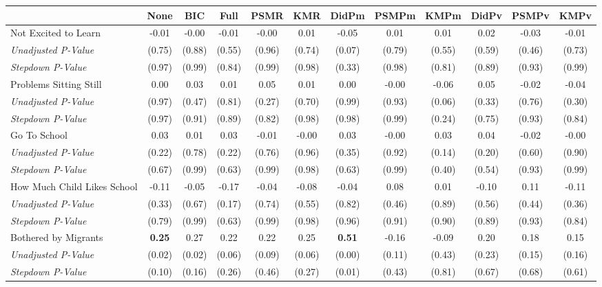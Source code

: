 \begin{tabular}{l c c c c c c c c c c c}
\toprule
 & None & BIC & Full & PSMR & KMR & DidPm & PSMPm & KMPm & DidPv & PSMPv & KMPv \\
\midrule
Not Excited to Learn & -0.01 & -0.00 & -0.01 & -0.00 & 0.01 & -0.05 & 0.01 & 0.01 & 0.02 & -0.03 & -0.01 \\
\quad \textit{Unadjusted P-Value} & (0.75) & (0.88) & (0.55) & (0.96) & (0.74) & (0.07) & (0.79) & (0.55) & (0.59) & (0.46) & (0.73) \\
\quad \textit{Stepdown P-Value} & (0.97) & (0.99) & (0.84) & (0.99) & (0.98) & (0.33) & (0.98) & (0.81) & (0.89) & (0.93) & (0.99) \\
Problems Sitting Still & 0.00 & 0.03 & 0.01 & 0.05 & 0.01 & 0.00 & -0.00 & -0.06 & 0.05 & -0.02 & -0.04 \\
\quad \textit{Unadjusted P-Value} & (0.97) & (0.47) & (0.81) & (0.27) & (0.70) & (0.99) & (0.93) & (0.06) & (0.33) & (0.76) & (0.30) \\
\quad \textit{Stepdown P-Value} & (0.97) & (0.91) & (0.89) & (0.82) & (0.98) & (0.98) & (0.99) & (0.24) & (0.75) & (0.93) & (0.84) \\
Go To School & 0.03 & 0.01 & 0.03 & -0.01 & -0.00 & 0.03 & -0.00 & 0.03 & 0.04 & -0.02 & -0.00 \\
\quad \textit{Unadjusted P-Value} & (0.22) & (0.78) & (0.22) & (0.76) & (0.96) & (0.35) & (0.92) & (0.14) & (0.20) & (0.60) & (0.90) \\
\quad \textit{Stepdown P-Value} & (0.67) & (0.99) & (0.63) & (0.99) & (0.98) & (0.63) & (0.99) & (0.40) & (0.54) & (0.93) & (0.99) \\
How Much Child Likes School & -0.11 & -0.05 & -0.17 & -0.04 & -0.08 & -0.04 & 0.08 & 0.01 & -0.10 & 0.11 & -0.11 \\
\quad \textit{Unadjusted P-Value} & (0.33) & (0.67) & (0.17) & (0.74) & (0.55) & (0.82) & (0.46) & (0.89) & (0.56) & (0.44) & (0.36) \\
\quad \textit{Stepdown P-Value} & (0.79) & (0.99) & (0.63) & (0.99) & (0.98) & (0.96) & (0.91) & (0.90) & (0.89) & (0.93) & (0.84) \\
Bothered by Migrants & \textbf{ 0.25 } & 0.27 & 0.22 & 0.22 & 0.25 & \textbf{ 0.51 } & -0.16 & -0.09 & 0.20 & 0.18 & 0.15 \\
\quad \textit{Unadjusted P-Value} & (0.02) & (0.02) & (0.06) & (0.09) & (0.06) & (0.00) & (0.11) & (0.43) & (0.23) & (0.15) & (0.16) \\
\quad \textit{Stepdown P-Value} & (0.10) & (0.16) & (0.26) & (0.46) & (0.27) & (0.01) & (0.43) & (0.81) & (0.67) & (0.68) & (0.61) \\

\end{tabular}

